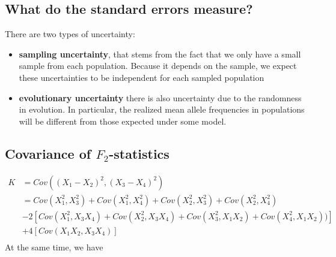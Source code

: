 \documentclass[12pt, letterpaper]{article}
\begin{document}
\subsection{What do the standard errors measure?}
There are two types of uncertainty:
\begin{itemize}
    \item \textbf{sampling uncertainty}, that stems from the fact that we only have a small sample from each population. Because it depends on the sample, we expect these uncertainties to be independent for each sampled population
    \item \textbf{evolutionary uncertainty} there is also uncertainty due to the randomness in evolution. In particular, the realized mean allele frequencies in populations will be different from those expected under some model. 
\end{itemize}

\subsection{Covariance of $F_2$-statistics}
\begin{align}
    K &= Cov( (X_1- X_2)^2, (X_3 - X_4)^2 )  \nonumber\\
    &= Cov(X_1^2, X_3^2) + Cov(X_1^2, X_4^2) + Cov(X_2^2, X_3^2) + Cov(X_2^2, X_4^2) \nonumber\\
    &- 2\left [ Cov(X_1^2, X_3X_4) + Cov(X_2^2, X_3X_4) + Cov(X_3^2, X_1X_2) + Cov(X_4^2, X_1X_2)) \right]\nonumber\\
    &+ 4\left[ Cov(X_1X_2, X_3X_4)\right]\nonumber\\
\end{align}
At the same time, we have
\end{document}
